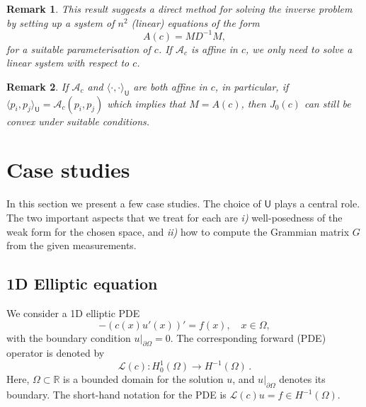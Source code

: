 \documentclass[12pt]{amsart}
\newcommand{\yy}[1]{\textcolor{blue}{{YY: #1}}}
\newcommand{\tvl}[1]{\textcolor{purple}{{TvL: #1}}}
\newtheorem{rem}{Remark}
\begin{document}
\begin{rem}\label{rem:direct}
This result suggests a direct method for solving the inverse problem by setting up a system of $n^2$ (linear) equations of the form
\[
A(c) = MD^{-1}M,
\]
for a suitable parameterisation of $c$. If $\mathcal{A}_c$ is affine in $c$,  we only need to  solve a linear system with respect to $c$.
\end{rem}

\begin{rem}\label{rem:linear}
If $\mathcal{A}_c$  and $\langle \cdot, \cdot \rangle_{\mathsf{U}}$ are both affine in $c$,  in particular,  if $\langle p_i,  p_j\rangle_{\mathsf{U}} = \mathcal{A}_c (p_i, p_j)$ which implies that $M = A(c)$,  then  $J_0(c)$ can still be convex under suitable conditions.  %
\end{rem}

\section{Case studies}\label{sec:cases}
In this section we present a few case studies. The choice of $\mathsf{U}$ plays a central role. The two important aspects that we treat for each are \emph{i)} well-posedness of the weak form for the chosen space, and \emph{ii)} how to compute the Grammian matrix $G$ from the given measurements.

\subsection{1D Elliptic equation}
We consider a 1D elliptic PDE 
\[
-\left( c(x) u'(x)\right)' =  f(x), \quad x\in \Omega,
\]
with the boundary condition $u|_{\partial \Omega} = 0$. The corresponding forward (PDE) operator is denoted by 
\[\mathcal{L}(c) : H^{1}_0(\Omega) \longrightarrow H^{-1}(\Omega)\,.
\]
Here, $\Omega \subset \mathbb{R}$ is a bounded domain for the solution $u$, and $u|_{\partial \Omega}$ denotes its boundary. The short-hand notation for the PDE is $\mathcal{L}(c) u = f \in H^{-1}(\Omega)$. 
\end{document}
